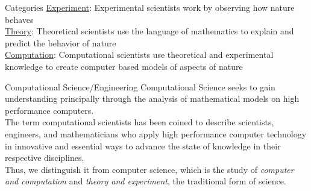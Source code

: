 \documentclass[xcolor=x11names,compress]{beamer}
\renewcommand{\(}{\begin{columns}}
\renewcommand{\)}{\end{columns}}
\newcommand{\<}[1]{\begin{column}{#1}}
\renewcommand{\>}{\end{column}}
\begin{document}
\begin{frame}{Categories}
\underline{Experiment}: Experimental scientists work by observing how nature behaves\\
\vspace*{0.25 in}
\underline{Theory}: Theoretical scientists use the language of mathematics to explain and predict the behavior of nature\\
\vspace*{0.25 in}
\underline{Computation}: Computational scientists use theoretical and experimental knowledge to create computer based models of aspects of nature
\end{frame}

\begin{frame}{Computational Science/Engineering}
\textcolor{dgreen}{Computational Science} seeks to gain understanding principally through the analysis of mathematical models on high performance computers.\\
\vspace*{0.25 in}
The term \textcolor{dgreen}{computational scientists} has been coined to describe scientists, engineers, and mathematicians who apply high performance computer technology in innovative and essential ways to advance the state of knowledge in their respective disciplines.\\
\vspace*{0.25 in}
Thus, we distinguish it from \textcolor{dgreen}{computer science}, which is the study of \emph{computer and computation} and \emph{theory and experiment}, the traditional form of science. 
\end{frame}
\end{document}
